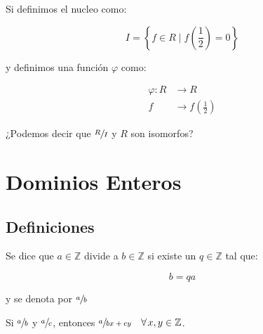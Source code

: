         \begin{ejercicio}
            Si definimos el nucleo como:

            \begin{equation*}
                I = \left\{ f \in R \mid f \left( \frac{1}{2} \right) = 0 \right\}
            \end{equation*}

            y definimos una función $\varphi$ como:

            \begin{align*}
                \varphi \colon R &\to R \\
                f &\to f \left( \frac{1}{2} \right)
            \end{align*}

            ¿Podemos decir que $\sfrac{R}{I}$ y $R$ son isomorfos?
        \end{ejercicio}


\newpage
\section{Dominios Enteros}


    \subsection{Definiciones}

        \begin{definicion}
            Se dice que $a \in \mathbb{Z}$ divide a $b \in \mathbb{Z}$ si existe un $q \in \mathbb{Z}$ tal que:

            \begin{equation}
                b = q a
            \end{equation}

            y se denota por $\sfrac{a}{b}$
        \end{definicion}

        \begin{teorema}
            Si $\sfrac{a}{b}$ y $\sfrac{a}{c}$, entonces $\sfrac{a}{bx + cy} \quad \forall \mkern2mu x, y \in \mathbb{Z}$.
        \end{teorema}

